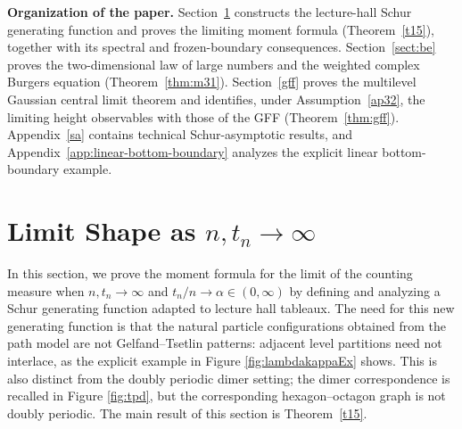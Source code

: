 \documentclass[11pt]{amsart}
\theoremstyle{plain}
\numberwithin{equation}{section}
\numberwithin{theorem}{section}
\numberwithin{figure}{section}
\begin{document}
\medskip
\noindent\textbf{Organization of the paper.}
Section~\ref{lsti} constructs the lecture-hall Schur generating
function and proves the limiting moment formula
(Theorem~\ref{t15}), together with its spectral and frozen-boundary
consequences. Section~\ref{sect:be} proves the two-dimensional
law of large numbers and the weighted complex Burgers equation
(Theorem~\ref{thm:m31}). Section~\ref{gff} proves the multilevel
Gaussian central limit theorem and identifies, under
Assumption~\ref{ap32}, the limiting height observables with those of
the GFF (Theorem~\ref{thm:gff}). Appendix~\ref{sa} contains technical
Schur-asymptotic results, and
Appendix~\ref{app:linear-bottom-boundary} analyzes the explicit linear
bottom-boundary example.


\section{Limit Shape as $n,t_n\to\infty$}\label{lsti}

In this section, we prove the moment formula for the limit of the counting measure when
$n,t_n\to\infty$ and $t_n/n\to\alpha\in(0,\infty)$ by defining and analyzing a
Schur generating function adapted to lecture hall tableaux. The need for this new
generating function is that the natural particle configurations obtained from the path model
are not Gelfand--Tsetlin patterns: adjacent level partitions need not interlace, as the
explicit example in Figure \ref{fig:lambdakappaEx} shows. This is also distinct from the
doubly periodic dimer setting; the dimer correspondence is recalled in Figure
\ref{fig:tpd}, but the corresponding hexagon--octagon graph is not doubly periodic.
The main result of this section is Theorem~\ref{t15}.
\end{document}
